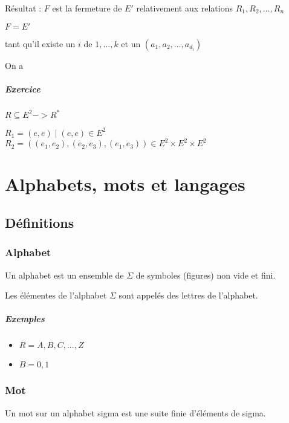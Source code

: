 \documentclass[12pt, a4paper]{report}
\begin{document}
Résultat : $F$ est la fermeture de $E'$ relativement aux relations $R_1, R_2, \dots, R_n$

$F=E'$

tant qu'il existe un $i$ de ${1, \dots, k}$ et un $(a_1, a_2, \dots, a_d_i)$

On a 

\paragraph{Exercice}

$R \subseteq E^2 -> R^{*}$

$R_1 = { (e,e) \mid (e,e) \in E^2}$
$R_2 = { ((e_1,e_2),(e_2,e_3),(e_1,e_3))  \in E^2 \times E^2 \times E^2 }$



\chapter{Alphabets, mots et langages}

\section{Définitions}

\subsection{Alphabet}

Un alphabet est un ensemble de $\Sigma$ de symboles (figures) non vide et fini.

Les élémentes de l'alphabet $\Sigma$ sont appelés des lettres de l'alphabet.

\paragraph{Exemples}

\begin{itemize}
\item $R = {A, B, C, ..., Z}$
\item $B = {0, 1}$
\end{itemize}

\subsection{Mot}
Un mot sur un alphabet sigma est une suite finie d'éléments de sigma.
\end{document}
